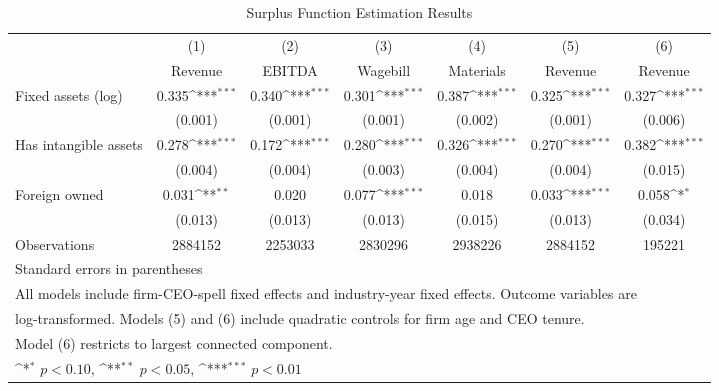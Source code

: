 \begin{table}[htbp]\centering
\def\sym#1{\ifmmode^{#1}\else\(^{#1}\)\fi}
\caption{Surplus Function Estimation Results}
\begin{tabular}{l*{6}{c}}
\toprule
                    &\multicolumn{1}{c}{(1)}&\multicolumn{1}{c}{(2)}&\multicolumn{1}{c}{(3)}&\multicolumn{1}{c}{(4)}&\multicolumn{1}{c}{(5)}&\multicolumn{1}{c}{(6)}\\
                    &\multicolumn{1}{c}{Revenue}&\multicolumn{1}{c}{EBITDA}&\multicolumn{1}{c}{Wagebill}&\multicolumn{1}{c}{Materials}&\multicolumn{1}{c}{Revenue}&\multicolumn{1}{c}{Revenue}\\
\midrule
Fixed assets (log)  &       0.335\sym{***}&       0.340\sym{***}&       0.301\sym{***}&       0.387\sym{***}&       0.325\sym{***}&       0.327\sym{***}\\
                    &     (0.001)         &     (0.001)         &     (0.001)         &     (0.002)         &     (0.001)         &     (0.006)         \\
\addlinespace
Has intangible assets&       0.278\sym{***}&       0.172\sym{***}&       0.280\sym{***}&       0.326\sym{***}&       0.270\sym{***}&       0.382\sym{***}\\
                    &     (0.004)         &     (0.004)         &     (0.003)         &     (0.004)         &     (0.004)         &     (0.015)         \\
\addlinespace
Foreign owned       &       0.031\sym{**} &       0.020         &       0.077\sym{***}&       0.018         &       0.033\sym{***}&       0.058\sym{*}  \\
                    &     (0.013)         &     (0.013)         &     (0.013)         &     (0.015)         &     (0.013)         &     (0.034)         \\
\midrule
Observations        &     2884152         &     2253033         &     2830296         &     2938226         &     2884152         &      195221         \\
\bottomrule
\multicolumn{7}{l}{\footnotesize Standard errors in parentheses}\\
\multicolumn{7}{l}{\footnotesize All models include firm-CEO-spell fixed effects and industry-year fixed effects. Outcome variables are}\\
\multicolumn{7}{l}{\footnotesize log-transformed. Models (5) and (6) include quadratic controls for firm age and CEO tenure.}\\
\multicolumn{7}{l}{\footnotesize Model (6) restricts to largest connected component.}\\
\multicolumn{7}{l}{\footnotesize \sym{*} \(p<0.10\), \sym{**} \(p<0.05\), \sym{***} \(p<0.01\)}\\
\end{tabular}
\end{table}
